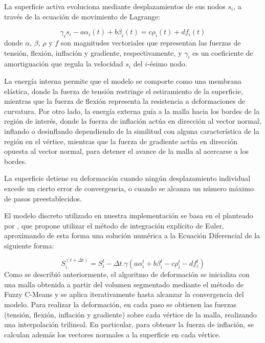 La superficie activa evoluciona mediante desplazamientos de sus nodos $s_{i}$, a través de la ecuación de movimiento de Lagrange:

%
\begin{equation}
\gamma_{i}s_{i} - a\alpha_{i}(t) + b\beta_{i}(t) = c\rho_{i}(t) + df_{i}(t)
\end{equation}
%
donde $\alpha$, $\beta$, $\rho$  y $f$ son magnitudes vectoriales que representan las fuerzas de tensión, flexión, inflación y gradiente, respectivamente, y $\gamma_{i}$ es un coeficiente de amortiguación que regula la velocidad $s_{i}$ del $i$-ésimo nodo.

La energía interna permite que el modelo se comporte como una membrana elástica, donde la fuerza de tensión restringe el estiramiento de la superficie, mientras que la fuerza de flexión representa la resistencia a deformaciones de curvatura. Por otro lado, la energía externa guía a la malla hacia los bordes de la región de interés, donde la fuerza de inflación actúa en dirección al vector normal, inflando o desinflando dependiendo de la similitud con alguna característica de la región en el vértice, mientras que la fuerza de gradiente actúa en dirección opuesta al vector normal, para detener el avance de la malla al acercarse a los bordes. 

La superficie detiene su deformación cuando ningún desplazamiento individual excede un cierto error de convergencia, o cuando se alcanza un número máximo de pasos preestablecidos.

El modelo discreto utilizado en nuestra implementación se basa en el planteado por \citep{mcinerney2000t}, que propone utilizar el método de integración explícito de Euler, aproximando de esta forma una solución numérica a la Ecuación Diferencial de la siguiente forma:

%
\begin{equation}
S^{(t+\Delta t)}_{i} = S_{i}^{t} - \Delta t.\gamma(a\alpha_{i}^{t} + b\beta_{i}^{t} - c\rho_{i}^{t} - df_{i}^{t})
\end{equation}
%
Como se describió anteriormente, el algoritmo de deformación se inicializa con una malla obtenida a partir del volumen segmentado mediante el método de Fuzzy C-Means y se aplica iterativamente hasta alcanzar la convergencia del modelo. Para realizar la deformación, en cada paso se obtienen las fuerzas (tensión, flexión, inflación y gradiente) sobre cada vértice de la malla, realizando una interpolación trilineal. En particular, para obtener la fuerza de inflación, se calculan además los vectores normales a la superficie en cada vértice. 

